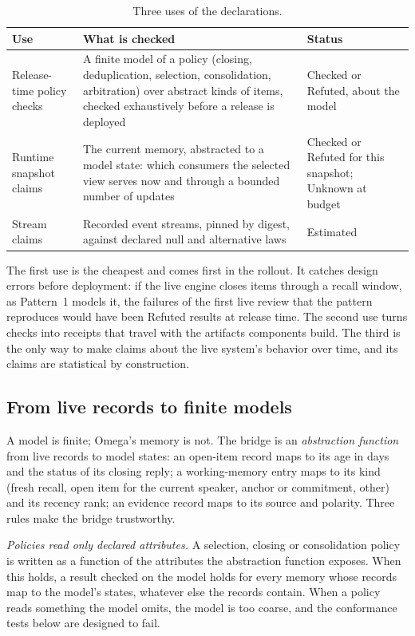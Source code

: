 \documentclass[11pt]{article}
\theoremstyle{definition}
\theoremstyle{plain}
\begin{document}
\begin{table}[ht]
\centering\small
\begin{tabularx}{\textwidth}{>{\raggedright\arraybackslash}p{2.9cm}>{\raggedright\arraybackslash}X>{\raggedright\arraybackslash}p{3.0cm}}
\toprule
Use & What is checked & Status\\
\midrule
Release-time policy checks & A finite model of a policy (closing, deduplication, selection,
consolidation, arbitration) over abstract kinds of items, checked exhaustively before a release
is deployed & Checked or Refuted, about the model\\
Runtime snapshot claims & The current memory, abstracted to a model state: which consumers the
selected view serves now and through a bounded number of updates & Checked or Refuted for this
snapshot; Unknown at budget\\
Stream claims & Recorded event streams, pinned by digest, against declared null and alternative
laws & Estimated\\
\bottomrule
\end{tabularx}
\caption{Three uses of the declarations.}\label{tab:uses}
\end{table}

The first use is the cheapest and comes first in the rollout. It catches design errors before
deployment: if the live engine closes items through a recall window, as Pattern~1 models it, the
failures of the first live review that the pattern reproduces would have been Refuted results at
release time. The second use turns checks into receipts that travel with the
artifacts components build. The third is the only way to make claims about the live system's
behavior over time, and its claims are statistical by construction.

\subsection{From live records to finite models}\label{sec:records}

A model is finite; Omega's memory is not. The bridge is an \emph{abstraction function} from live
records to model states: an open-item record maps to its age in days and the status of its closing
reply; a working-memory entry maps to its kind (fresh recall, open item for the current speaker,
anchor or commitment, other) and its recency rank; an evidence record maps to its source and
polarity. Three rules make the bridge trustworthy.

\emph{Policies read only declared attributes.} A selection, closing or consolidation policy is
written as a function of the attributes the abstraction function exposes. When this holds, a
result checked on the model holds for every memory whose records map to the model's states,
whatever else the records contain. When a policy reads something the model omits, the model is
too coarse, and the conformance tests below are designed to fail.
\end{document}
